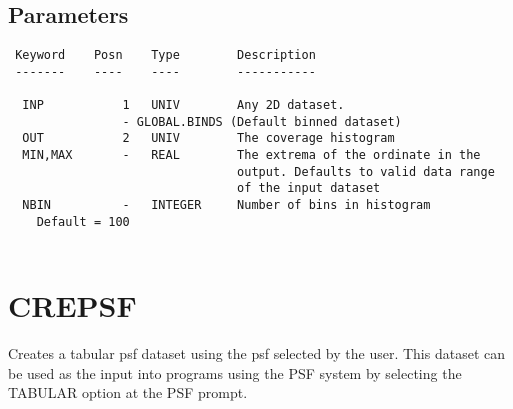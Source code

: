 \documentclass{book}
\renewcommand{\_}{{\tt\char'137}}     %
\begin{document}
\subsection{Parameters}
\begin{verbatim}
 Keyword    Posn    Type        Description
 -------    ----    ----        -----------
 
  INP           1   UNIV        Any 2D dataset.
                - GLOBAL.BINDS (Default binned dataset)
  OUT           2   UNIV        The coverage histogram
  MIN,MAX       -   REAL        The extrema of the ordinate in the
                                output. Defaults to valid data range
                                of the input dataset
  NBIN          -   INTEGER     Number of bins in histogram
    Default = 100
 
\end{verbatim}\section{CREPSF}
Creates a tabular psf dataset using the psf selected by the user.
This dataset can be used as the input into programs using the PSF
system by selecting the TABULAR option at the PSF prompt.
 
\end{document}
